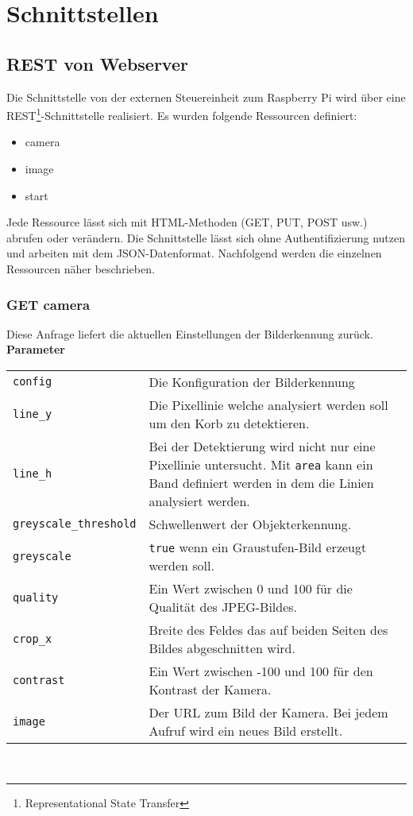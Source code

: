\section{Schnittstellen}

\subsection{REST von Webserver}

Die Schnittstelle von der externen Steuereinheit zum Raspberry Pi wird über eine REST\footnote{Representational State Transfer}-Schnittstelle realisiert. Es wurden folgende Ressourcen definiert:
\begin{itemize}
	\item camera
	\item image
	\item start
\end{itemize}
Jede Ressource lässt sich mit HTML-Methoden (GET, PUT, POST usw.) abrufen oder verändern. Die Schnittstelle lässt sich ohne Authentifizierung nutzen und arbeiten mit dem JSON-Datenformat. Nachfolgend werden die einzelnen Ressourcen näher beschrieben.

\subsubsection{GET camera}

Diese Anfrage liefert die aktuellen Einstellungen der Bilderkennung zurück.\\

\textbf{Parameter}


\begin{tabular}{l p{16cm}}
	\texttt{config} & Die Konfiguration der Bilderkennung \\
	\texttt{line\_y} & Die Pixellinie welche analysiert werden soll um den Korb zu detektieren. \\
	\texttt{line\_h} & Bei der Detektierung wird nicht nur eine Pixellinie untersucht. Mit \texttt{area} kann ein Band definiert werden in dem die Linien analysiert werden. \\
	\texttt{greyscale\_threshold} & Schwellenwert der Objekterkennung. \\
	\texttt{greyscale} & \texttt{true} wenn ein Graustufen-Bild erzeugt werden soll. \\
	\texttt{quality} & Ein Wert zwischen 0 und 100 für die Qualität des JPEG-Bildes. \\
	\texttt{crop\_x} & Breite des Feldes das auf beiden Seiten des Bildes abgeschnitten wird. \\
	\texttt{contrast} & Ein Wert zwischen -100 und 100 für den Kontrast der Kamera. \\
	\texttt{image} & Der URL zum Bild der Kamera. Bei jedem Aufruf wird ein neues Bild erstellt.
\end{tabular}\\

